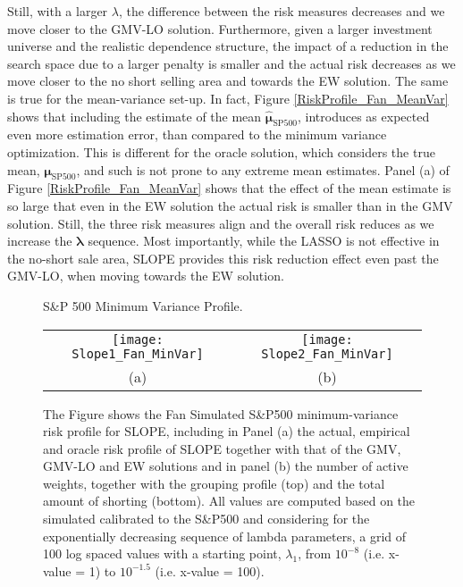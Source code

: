 \documentclass[12pt, a4paper]{article}
\newcommand{\bfmu}{\boldsymbol{\mu} }
\newcommand{\bflambda}{\boldsymbol{\lambda}}
\begin{document}
Still, with a larger $\lambda$, the difference between the risk measures decreases and we move closer to the GMV-LO solution. Furthermore, given a larger investment universe and the realistic dependence structure, the impact of a reduction in the search space due to a larger penalty is smaller and the actual risk decreases as we move closer to the no short selling area and towards the EW solution. The same is true for the mean-variance set-up. In fact, Figure \ref{RiskProfile_Fan_MeanVar} shows that including the estimate of the mean $\hat{\bfmu}_{\text{SP500}}$, introduces as expected even more estimation error, than compared to the minimum variance optimization. This is different for the oracle solution, which considers the true mean, $\bfmu_{\text{SP500}}$, and such is not prone to any extreme mean estimates. Panel (a) of Figure \ref{RiskProfile_Fan_MeanVar} shows that the effect of the mean estimate is so large that even in the EW solution the actual risk is smaller than in the GMV solution. Still, the three risk measures align and the overall risk reduces as we increase the $\bflambda$ sequence. Most importantly, while the LASSO is not effective in the no-short sale area, SLOPE provides this risk reduction effect even past the GMV-LO, when moving towards the EW solution.
%
\begin{figure}[h!]
\centering
\caption{S\&P 500 Minimum Variance Profile.}\label{RiskProfile_Fan_MinVar}
{\begin{tabular}{cc}%
\texttt{[image: Slope1\_Fan\_MinVar]} & \texttt{[image: Slope2\_Fan\_MinVar]}\\
(a) & (b) \\
\end{tabular}}
\captionsetup{font=scriptsize,labelfont=scriptsize, width=\textwidth}
     \caption*{The Figure shows the Fan Simulated S\&P500 minimum-variance risk profile for SLOPE, including in Panel (a) the actual, empirical and oracle risk profile of SLOPE together with that of the GMV, GMV-LO and EW solutions and in panel (b) the number of active weights, together with the grouping profile (top) and the total amount of shorting (bottom). All values are computed based on the \cite{Fan2008} simulated calibrated to the S\&P500 and considering for the exponentially decreasing sequence of lambda parameters, a grid of 100 log spaced values with a starting point, $\lambda_{1}$, from $10^{-8}$ (i.e. x-value = 1) to $10^{-1.5}$ (i.e. x-value = 100).}
\end{figure}
\end{document}
